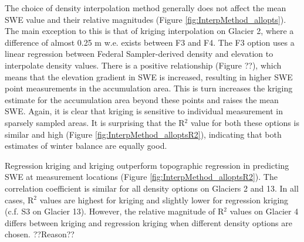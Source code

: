 \documentclass{sfuthesis}
\begin{document}
The choice of density interpolation method generally does not affect the mean SWE value and their relative magnitudes (Figure \ref{fig:InterpMethod_allopts}). The main exception to this is that of kriging interpolation on Glacier 2, where a difference of almost 0.25 m w.e. exists between F3 and F4. The F3 option uses a linear regression between Federal Sampler-derived density and elevation to interpolate density values. There is a positive relationship (Figure ??), which means that the elevation gradient in SWE is increased, resulting in higher SWE point measurements in the accumulation area. This is turn increases the kriging estimate for the accumulation area beyond these points and raises the mean SWE. Again, it is clear that kriging is sensitive to individual measurement in sparsely sampled areas. It is surprising that the R$^2$ value for both these options is similar and high (Figure \ref{fig:InterpMethod_alloptsR2}), indicating that both estimates of winter balance are equally good. 

Regression kriging and kriging outperform topographic regression in predicting SWE at measurement locations (Figure \ref{fig:InterpMethod_alloptsR2}). The correlation coefficient is similar for all density options on Glaciers 2 and 13. In all cases, R$^2$ values are highest for kriging and slightly lower for regression kriging (c.f. S3 on Glacier 13). However, the relative magnitude of R$^2$ values on Glacier 4 differs between kriging and regression kriging when different density options are chosen.  ??Reason??
\end{document}
